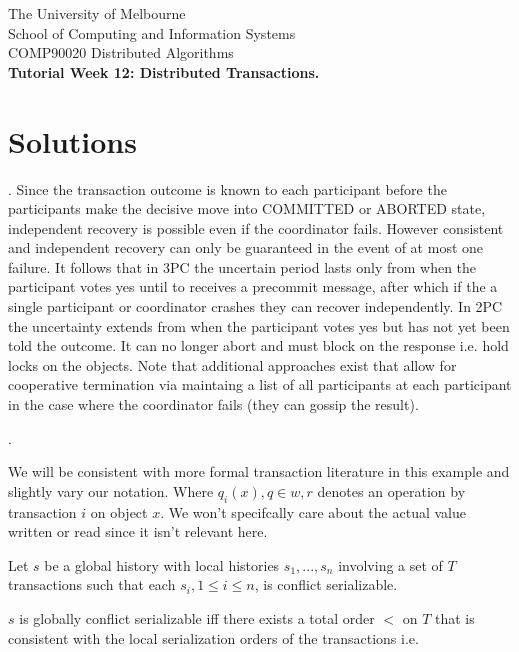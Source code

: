 \documentclass[12pt]{article}
\newcounter{question}
\newcommand{\question}[1]{
    \stepcounter{question}
    \thequestion. #1 \hfill
}
\begin{document}
\begin{center}
    {\sc The University of Melbourne
        \\
        School of Computing and Information Systems
        \\
    COMP90020 Distributed Algorithms}
    \bigskip \\
    {\Large\bf Tutorial Week 12: Distributed Transactions.}
    \bigskip \\
\end{center}


\section*{Solutions}

\setcounter{question}{50}

\question{Since the transaction outcome is known to each participant before the participants make the decisive move into COMMITTED or ABORTED state, independent recovery is possible even if the coordinator fails.
However consistent and independent recovery can only be guaranteed in the event of at most one failure.  It follows that in 3PC the uncertain period lasts only from when the participant votes yes until to receives a precommit message, after which if the a single participant or coordinator crashes they can recover independently.
In 2PC the uncertainty extends from when the participant votes yes but has not yet been told the outcome. It can no longer abort and must block on the response i.e. hold locks on the objects.
Note that additional approaches exist that allow for cooperative termination via maintaing a list of all participants at each participant in the case where the coordinator fails (they can gossip the result).}


\question{}

We will be consistent with more formal transaction literature in this example and slightly vary our notation. Where $q_i(x), q \in {w,r}$ denotes an operation by transaction $i$ on object $x$. We won't specifcally care about the actual value written or read since it isn't relevant here.

Let $s$ be a global history with local histories $s_1,...,s_n$ involving a set of $T$ transactions such that each $s_i, 1 \leq i \leq n$, is conflict serializable.

$s$ is globally conflict serializable iff there exists a total order $<$ on $T$ that is consistent with the local serialization orders of the transactions i.e.
\end{document}
